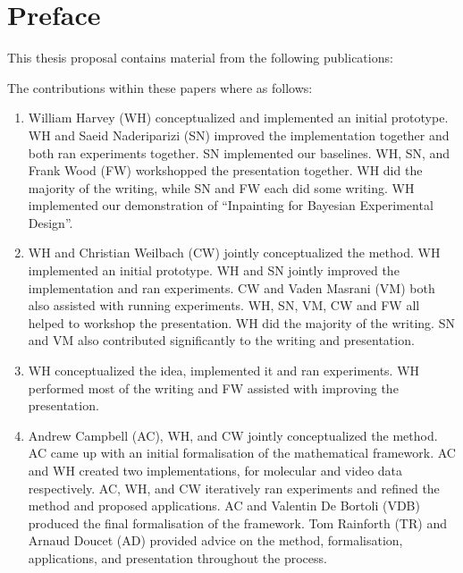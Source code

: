 
\chapter{Preface}

This thesis proposal contains material from the following publications:

The contributions within these papers where as follows:
\begin{enumerate}
    \item William Harvey (WH) conceptualized and implemented an initial prototype. WH and Saeid Naderiparizi (SN) improved the implementation together and both ran experiments together.  SN implemented our baselines. WH, SN, and Frank Wood (FW) workshopped the presentation together. WH did the majority of the writing, while SN and FW each did some writing. WH implemented our demonstration of ``Inpainting for Bayesian Experimental Design''.
    \item WH and Christian Weilbach (CW) jointly conceptualized the method. WH implemented an initial prototype. WH and SN jointly improved the implementation and ran experiments. CW and Vaden Masrani (VM) both also assisted with running experiments. WH, SN, VM, CW and FW all helped to workshop the presentation. WH did the majority of the writing. SN and VM also contributed significantly to the writing and presentation.
    \item WH conceptualized the idea, implemented it and ran experiments. WH performed most of the writing and FW assisted with improving the presentation.
    \item Andrew Campbell (AC), WH, and CW jointly conceptualized the method. AC came up with an initial formalisation of the mathematical framework. AC and WH created two implementations, for molecular and video data respectively. AC, WH, and CW iteratively ran experiments and refined the method and proposed applications. AC and Valentin De Bortoli (VDB) produced the final formalisation of the framework. Tom Rainforth (TR) and Arnaud Doucet (AD) provided advice on the method, formalisation, applications, and presentation throughout the process.
\end{enumerate}